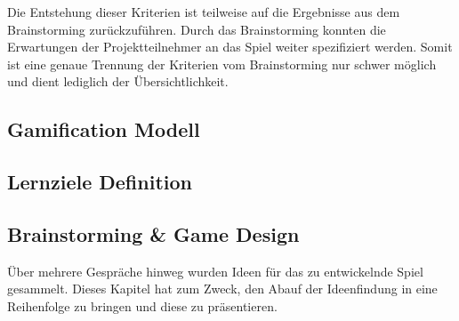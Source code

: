 	Die Entstehung dieser Kriterien ist teilweise auf die Ergebnisse aus dem Brainstorming zurückzuführen. Durch das Brainstorming konnten die Erwartungen der Projektteilnehmer an das Spiel weiter spezifiziert werden. Somit ist eine genaue Trennung der Kriterien vom Brainstorming nur schwer möglich und dient lediglich der Übersichtlichkeit.

\subsection{Gamification Modell}
\subsection{Lernziele Definition}

\subsection{Brainstorming \& Game Design}\label{ssec:idee}
	Über mehrere Gespräche hinweg wurden Ideen für das zu entwickelnde Spiel gesammelt. Dieses Kapitel hat zum Zweck, den Abauf der Ideenfindung in eine Reihenfolge zu bringen und diese zu präsentieren.
